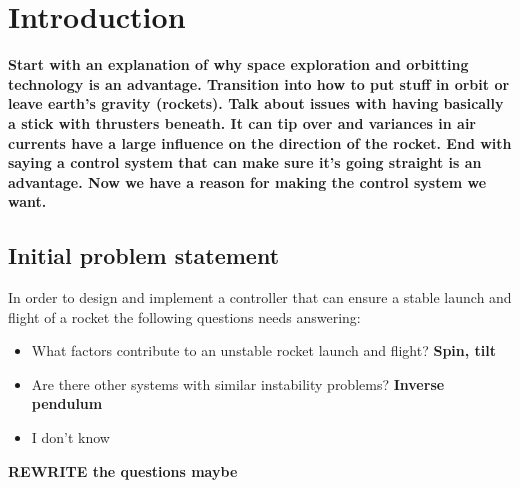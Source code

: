 \chapter{Introduction}
\textbf{Start with an explanation of why space exploration and orbitting technology is an advantage. Transition into how to put stuff in orbit or leave earth's gravity (rockets). Talk about issues with having basically a stick with thrusters beneath. It can tip over and variances in air currents have a large influence on the direction of the rocket. End with saying a control system that can make sure it's going straight is an advantage. Now we have a reason for making the control system we want.}

\section{Initial problem statement}
In order to design and implement a controller that can ensure a stable launch and flight of a rocket the following questions needs answering: 
\begin{itemize}
\item What factors contribute to an unstable rocket launch and flight? \textbf{Spin, tilt}
\item Are there other systems with similar instability problems? \textbf{Inverse pendulum}
\item I don't know
\end{itemize}
\textbf{REWRITE the questions maybe}
